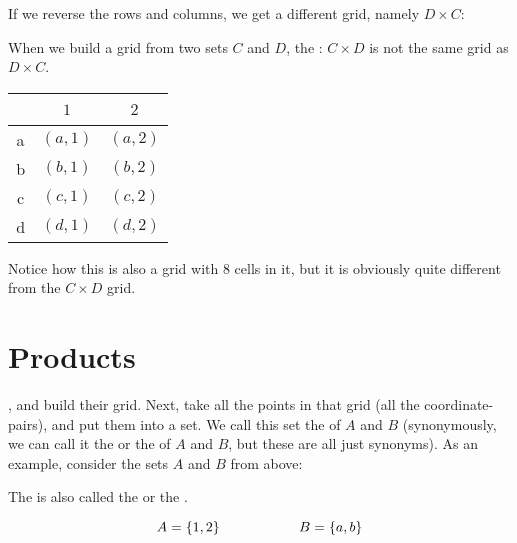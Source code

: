 \documentclass[../../../main.tex]{subfiles}
\begin{document}
\begin{example}

If we reverse the rows and columns, we get a different grid, namely $D \times C$:

\begin{aside}
  \begin{remark}
    When we build a grid from two sets $C$ and $D$, the : $C \times D$ is not the same grid as $D \times C$.
  \end{remark}
\end{aside}

\begin{center}
  \begin{tabular}{| c | c | c |}
    \hline
    ~ & $1$ & $2$ \\
    \hline
    a & $(a, 1)$ & $(a, 2)$ \\
    \hline
    b & $(b, 1)$ & $(b, 2)$ \\
    \hline
    c & $(c, 1)$ & $(c, 2)$ \\
    \hline
    d & $(d, 1)$ & $(d, 2)$ \\
    \hline
  \end{tabular}
\end{center}

Notice how this is also a grid with 8 cells in it, but it is obviously quite different from the $C \times D$ grid.

\end{example}


\section{Products}

, and build their grid. Next, take all the points in that grid (all the coordinate-pairs), and put them into a set. We call this set the  of $A$ and $B$ (synonymously, we can call it the  or the  of $A$ and $B$, but these are all just synonyms). As an example, consider the sets $A$ and $B$ from above:

\begin{terminology}
  The  is also called the  or the .
\end{terminology}

\begin{equation*}
  A = \{ 1, 2 \} \hskip 2cm B = \{ a, b \}
\end{equation*}
\end{document}
